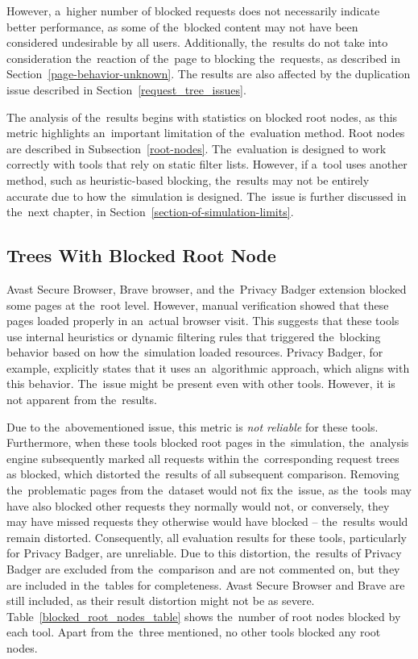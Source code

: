 However, a~higher number of blocked requests does not necessarily indicate better performance, as some of the~blocked content may not have been considered undesirable by all users. Additionally, the~results do not take into consideration the~reaction of the~page to blocking the~requests, as described in Section~\ref{page-behavior-unknown}. The results are also affected by the duplication issue described in Section~\ref{request_tree_issues}.

The analysis of the~results begins with statistics on blocked root nodes, as this metric highlights an~important limitation of the~evaluation method. Root nodes are described in Subsection~\ref{root-nodes}. The~evaluation is designed to work correctly with tools that rely on static filter lists. However, if a~tool uses another method, such as heuristic-based blocking, the~results may not be entirely accurate due to how the~simulation is designed. The~issue is further discussed in the~next chapter, in Section~\ref{section-of-simulation-limits}.

\subsection{Trees With Blocked Root Node}
\label{root-results-blocking}
Avast Secure Browser, Brave browser, and the~Privacy Badger extension blocked some pages at the~root level. However, manual verification showed that these pages loaded properly in an~actual browser visit. This suggests that these tools use internal heuristics or dynamic filtering rules that triggered the~blocking behavior based on how the~simulation loaded resources. Privacy Badger, for example, explicitly states that it uses an~algorithmic approach, which aligns with this behavior. The~issue might be present even with other tools. However, it is not apparent from the~results.

Due to the~abovementioned issue, this metric is \emph{not reliable} for these tools. Furthermore, when these tools blocked root pages in the~simulation, the~analysis engine subsequently marked all requests within the~corresponding request trees as blocked, which distorted the~results of all subsequent comparison. Removing the~problematic pages from the~dataset would not fix the~issue, as the~tools may have also blocked other requests they normally would not, or conversely, they may have missed requests they otherwise would have blocked -- the~results would remain distorted. Consequently, all evaluation results for these tools, particularly for Privacy Badger, are unreliable. Due to this distortion, the~results of Privacy Badger are excluded from the~comparison and are not commented on, but they are included in the~tables for completeness. Avast Secure Browser and Brave are still included, as their result distortion might not be as severe. Table~\ref{blocked_root_nodes_table} shows the~number of root nodes blocked by each tool. Apart from the~three mentioned, no other tools blocked any root nodes.

